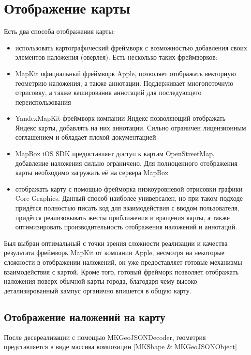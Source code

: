   \section{Отображение карты}
    Есть два способа отображения карты:
    \begin{itemize}
      \item использовать картографический фреймворк с возможностью добавления своих элементов наложения (оверлея). Есть несколько таких фреймворков:
      \item MapKit официальный фреймворк Apple, позволяет отображать векторную геометрию наложения, а также аннотации. Поддерживает многопоточную отрисовку, а также кеширования аннотаций для последующего переиспользования
      \item YandexMapKit фреймворк компании Яндекс позволяющий отображать Яндекс карты, добавлять на них аннотации. Сильно ограничен лицензионным соглашением и обладает плохой документацией
      \item MapBox iOS SDK предоставляет доступ к картам OpenStreetMap, добавление наложения сильно ограничено. Для полноценного отображения карты необходимо загружать её на сервера MapBox
      \item отображать карту с помощью фрейморка низкоуровневой отрисовки графики Core Graphics. Данный способ наиболее универсален, но при таком подходе придётся полностью писать код для взаимодействия с вводом пользователя, придётся реализовывать жесты приближения и вращения карты, а также оптимизировать производительность отображения наложений и аннотаций.
    \end{itemize}


    Был выбран оптимальный с точки зрения сложности реализации и качества результата фреймворк MapKit от компании Apple, несмотря на некоторые сложности в отображении наложений, он уже предоставляет готовые механизмы взаимодействия с картой. Кроме того, готовый фрейморк позволяет отображать наложения поверх обычной карты города, благодаря чему высоко детализированный кампус органично впишется в общую карту.

    \subsection{Отображение наложений на карту}
      После десереализации с помощью MKGeoJSONDecoder, геометрия представляется в виде массива композиции [MKShape \& MKGeoJSONObject]


